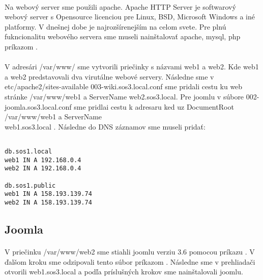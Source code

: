 \paragraph{}
Na webový server sme použili apache. Apache HTTP Server je softwarový webový server s Opensource licenciou pre Linux, BSD, Microsoft Windows a iné platformy. V dnešnej dobe je najrozšírenejším na celom svete. Pre plnú fukncionalitu webového servera sme museli nainštalovať apache, mysql, php príkazom  .
\paragraph{}
V adresári /var/www/ sme vytvorili priečinky s názvami web1 a web2. Kde web1 a web2 predstavovali dva virutálne webové servery. Následne sme v etc/apache2/sites-available 003-wiki.sos3.local.conf sme pridali cestu ku web stránke /var/www/web1 a ServerName web2.sos3.local. Pre joomlu v súbore 002-joomla.sos3.local.conf sme pridlai cestu k adresaru ked uz DocumentRoot /var/www/web1 a ServerName\\ web1.sos3.local . Následne do DNS záznamov sme museli pridať:	

\noindent
{\selectfont

\begin{small}

\begin{verbatim}

db.sos1.local
web1 IN A 192.168.0.4
web2 IN A 192.168.0.4

db.sos1.public
web1 IN A 158.193.139.74
web2 IN A 158.193.139.74

\end{verbatim}

\end{small}

}

\subsection{Joomla}
\paragraph{}
V priečinku /var/www/web2 sme stiahli joomlu verziu 3.6 pomocou príkazu  . V ďalšom kroku sme odzipovali tento súbor príkazom  . Nás\-ledne sme v prehliadači otvorili web1.sos3.local a podľa príslušných krokov sme nainštalovali joomlu.

